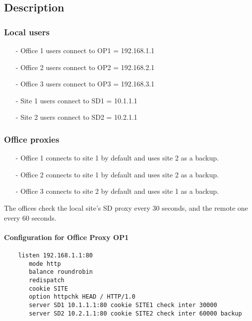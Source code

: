 \subsection{Description}

\subsubsection{Local users}

\begin{itemize}
\item[-] Office 1 users connect to OP1 = 192.168.1.1
\item[-] Office 2 users connect to OP2 = 192.168.2.1
\item[-] Office 3 users connect to OP3 = 192.168.3.1
\item[-] Site 1 users connect to SD1 = 10.1.1.1
\item[-] Site 2 users connect to SD2 = 10.2.1.1
\end{itemize}

\subsubsection{Office proxies}

\begin{itemize}
\item[-] Office 1 connects to site 1 by default and uses site 2 as a backup.
\item[-] Office 2 connects to site 1 by default and uses site 2 as a backup.
\item[-] Office 3 connects to site 2 by default and uses site 1 as a backup.
\end{itemize}

The offices check the local site's SD proxy every 30 seconds, and the
remote one every 60 seconds.

\paragraph{Configuration for Office Proxy OP1}

\begin{verbatim}
    listen 192.168.1.1:80
       mode http
       balance roundrobin
       redispatch
       cookie SITE
       option httpchk HEAD / HTTP/1.0
       server SD1 10.1.1.1:80 cookie SITE1 check inter 30000
       server SD2 10.2.1.1:80 cookie SITE2 check inter 60000 backup
\end{verbatim}

